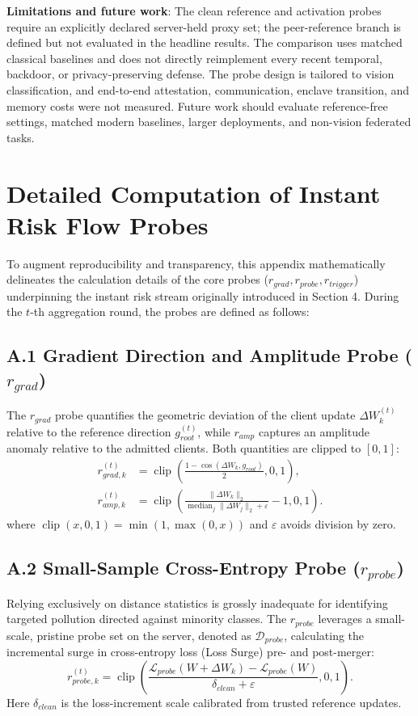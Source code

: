 \documentclass[final,5p,times,twocolumn]{elsarticle/elsarticle}
\begin{document}
\textbf{Limitations and future work}: The clean reference and activation probes
require an explicitly declared server-held proxy set; the peer-reference
branch is defined but not evaluated in the headline results. The comparison
uses matched classical baselines and does not directly reimplement every recent
temporal, backdoor, or privacy-preserving defense. The probe design is tailored
to vision classification, and end-to-end attestation, communication, enclave
transition, and memory costs were not measured. Future work should evaluate
reference-free settings, matched modern baselines, larger deployments, and
non-vision federated tasks.

\appendix
\section{Detailed Computation of Instant Risk Flow Probes}
To augment reproducibility and transparency, this appendix mathematically delineates the calculation details of the core probes ($r_{grad}, r_{probe}, r_{trigger}$) underpinning the instant risk stream originally introduced in Section 4. During the $t$-th aggregation round, the probes are defined as follows:

\subsection{A.1 Gradient Direction and Amplitude Probe \texorpdfstring{($r_{grad}$)}{(r-grad)}}
The $r_{grad}$ probe quantifies the geometric deviation of the client update $\Delta W_k^{(t)}$ relative to the reference direction $g_{root}^{(t)}$, while $r_{amp}$ captures an amplitude anomaly relative to the admitted clients. Both quantities are clipped to $[0,1]$:
\begin{align}
 r_{grad,k}^{(t)}&=\operatorname{clip}\!\left(
 \frac{1-\cos(\Delta W_k,g_{root})}{2},0,1\right),\\
 r_{amp,k}^{(t)}&=\operatorname{clip}\!\left(
 \frac{\|\Delta W_k\|_2}{\operatorname{median}_j\|\Delta W_j\|_2+\varepsilon}
 -1,0,1\right).
\end{align}
where $\operatorname{clip}(x,0,1)=\min(1,\max(0,x))$ and $\varepsilon$ avoids division by zero.
\subsection{A.2 Small-Sample Cross-Entropy Probe \texorpdfstring{($r_{probe}$)}{(r-probe)}}
Relying exclusively on distance statistics is grossly inadequate for identifying targeted pollution directed against minority classes. The $r_{probe}$ leverages a small-scale, pristine probe set on the server, denoted as $\mathcal{D}_{probe}$, calculating the incremental surge in cross-entropy loss (Loss Surge) pre- and post-merger:
\begin{equation}
    r_{probe,k}^{(t)}=\operatorname{clip}\!\left(
    \frac{\mathcal{L}_{probe}(W+\Delta W_k)-\mathcal{L}_{probe}(W)}
    {\delta_{clean}+\varepsilon},0,1\right).
\end{equation}
Here $\delta_{clean}$ is the loss-increment scale calibrated from trusted reference updates.
\end{document}
